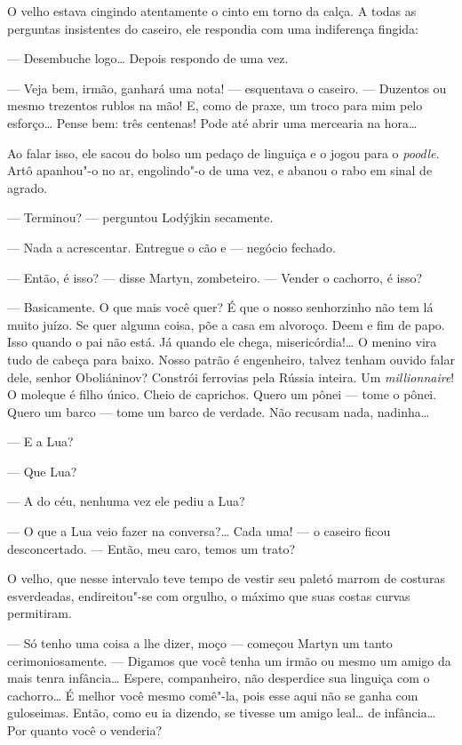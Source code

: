 O velho estava cingindo atentamente o cinto em torno da calça. A todas
as perguntas insistentes do caseiro, ele respondia com uma indiferença
fingida:

--- Desembuche logo\ldots{} Depois respondo de uma vez.

--- Veja bem, irmão, ganhará uma nota! --- esquentava o caseiro. ---
Duzentos ou mesmo trezentos rublos na mão! E, como de praxe, um troco
para mim pelo esforço\ldots{} Pense bem: três centenas! Pode até abrir uma
mercearia na hora\ldots{}

Ao falar isso, ele sacou do bolso um pedaço de linguiça e o jogou para o
\emph{poodle}. Artô apanhou"-o no ar, engolindo"-o de uma vez, e abanou o
rabo em sinal de agrado.

--- Terminou? --- perguntou Lodýjkin secamente.

--- Nada a acrescentar. Entregue o cão e --- negócio fechado.

--- Então, é isso? --- disse Martyn, zombeteiro. --- Vender o cachorro,
é isso?

--- Basicamente. O que mais você quer? É que o nosso senhorzinho não tem
lá muito juízo. Se quer alguma coisa, põe a casa em alvoroço. Deem e fim
de papo. Isso quando o pai não está. Já quando ele chega,
misericórdia!\ldots{} O menino vira tudo de cabeça para baixo. Nosso patrão é
engenheiro, talvez tenham ouvido falar dele, senhor Oboliáninov?
Constrói ferrovias pela Rússia inteira. Um \emph{millionnaire}! O moleque
é filho único. Cheio de caprichos. Quero um pônei --- tome o pônei.
Quero um barco --- tome um barco de verdade. Não recusam nada,
nadinha\ldots{}

--- E a Lua?

--- Que Lua?

--- A do céu, nenhuma vez ele pediu a Lua?

--- O que a Lua veio fazer na conversa?\ldots{} Cada uma! --- o caseiro ficou
desconcertado. --- Então, meu caro, temos um trato?

O velho, que nesse intervalo teve tempo de vestir seu paletó marrom de
costuras esverdeadas, endireitou"-se com orgulho, o máximo que suas
costas curvas permitiram.

--- Só tenho uma coisa a lhe dizer, moço --- começou Martyn um tanto
cerimoniosamente. --- Digamos que você tenha um irmão ou mesmo um amigo
da mais tenra infância\ldots{} Espere, companheiro, não desperdice sua
linguiça com o cachorro\ldots{} É melhor você mesmo comê"-la, pois esse aqui
não se ganha com guloseimas. Então, como eu ia dizendo, se tivesse um
amigo leal\ldots{} de infância\ldots{} Por quanto você o venderia?

